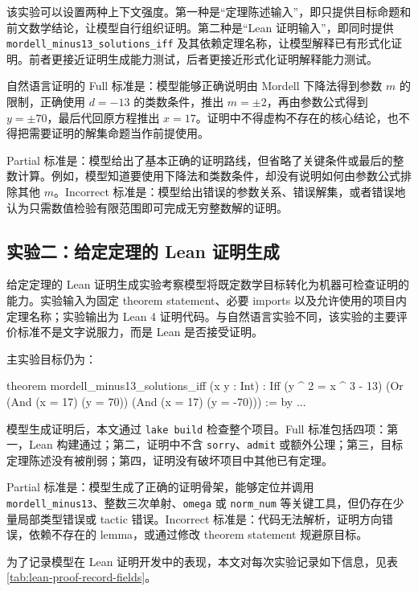 该实验可以设置两种上下文强度。第一种是“定理陈述输入”，即只提供目标命题和前文数学结论，让模型自行组织证明。第二种是“Lean 证明输入”，即同时提供 \texttt{mordell\_minus13\_solutions\_iff} 及其依赖定理名称，让模型解释已有形式化证明。前者更接近证明生成能力测试，后者更接近形式化证明解释能力测试。

自然语言证明的 Full 标准是：模型能够正确说明由 Mordell 下降法得到参数 \(m\) 的限制，正确使用 \(d=-13\) 的类数条件，推出 \(m=\pm 2\)，再由参数公式得到 \(y=\pm 70\)，最后代回原方程推出 \(x=17\)。证明中不得虚构不存在的核心结论，也不得把需要证明的解集命题当作前提使用。

Partial 标准是：模型给出了基本正确的证明路线，但省略了关键条件或最后的整数计算。例如，模型知道要使用下降法和类数条件，却没有说明如何由参数公式排除其他 \(m\)。Incorrect 标准是：模型给出错误的参数关系、错误解集，或者错误地认为只需数值检验有限范围即可完成无穷整数解的证明。

\subsection{实验二：给定定理的 Lean 证明生成}

给定定理的 Lean 证明生成实验考察模型将既定数学目标转化为机器可检查证明的能力。实验输入为固定 theorem statement、必要 imports 以及允许使用的项目内定理名称；实验输出为 Lean 4 证明代码。与自然语言实验不同，该实验的主要评价标准不是文字说服力，而是 Lean 是否接受证明。

主实验目标仍为：

\begin{leanlisting}
theorem mordell_minus13_solutions_iff (x y : Int) :
    Iff (y ^ 2 = x ^ 3 - 13)
      (Or (And (x = 17) (y = 70)) (And (x = 17) (y = -70))) := by
  ...
\end{leanlisting}

模型生成证明后，本文通过 \texttt{lake build} 检查整个项目。Full 标准包括四项：第一，Lean 构建通过；第二，证明中不含 \texttt{sorry}、\texttt{admit} 或额外公理；第三，目标定理陈述没有被削弱；第四，证明没有破坏项目中其他已有定理。

Partial 标准是：模型生成了正确的证明骨架，能够定位并调用 \texttt{mordell\_minus13}、整数三次单射、\texttt{omega} 或 \texttt{norm\_num} 等关键工具，但仍存在少量局部类型错误或 tactic 错误。Incorrect 标准是：代码无法解析，证明方向错误，依赖不存在的 lemma，或通过修改 theorem statement 规避原目标。

为了记录模型在 Lean 证明开发中的表现，本文对每次实验记录如下信息，见表 \ref{tab:lean-proof-record-fields}。

